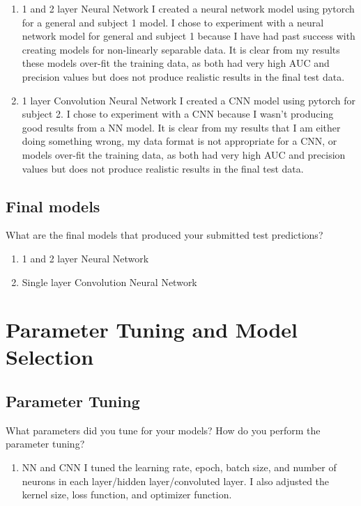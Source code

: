 \documentclass[11pt,a4paper]{article}
\begin{document}
\begin{enumerate}
	\item 1 and 2 layer Neural Network
		\subitem
		I created a neural network model using pytorch for a general and subject 1 model.
		I chose to experiment with a neural network model for general and subject 1 because I have had past success with creating models for non-linearly separable data.
		It is clear from my results these models over-fit the training data, as both had very high AUC and precision values but does not produce realistic results in the final test data.

	\item 1 layer Convolution Neural Network
		\subitem
		I created a CNN model using pytorch for subject 2.
		I chose to experiment with a CNN because I wasn't producing good results from a NN model.
		It is clear from my results that I am either doing something wrong, my data format is not appropriate for a CNN, or models over-fit the training data, as both had very high AUC and precision values but does not produce realistic results in the final test data.
\end{enumerate}


\subsection{Final models}
What are the final models that produced your submitted test predictions?
\begin{enumerate}
	\item 1 and 2 layer Neural Network
	\item Single layer Convolution Neural Network
\end{enumerate}

\section{Parameter Tuning and Model Selection }
\subsection{Parameter Tuning}
What parameters did you tune for your models? How do you perform the parameter tuning?
\begin{enumerate}
	\item NN and CNN
		\subitem
		I tuned the learning rate, epoch, batch size, and number of neurons in each layer/hidden layer/convoluted layer.
		I also adjusted the kernel size, loss function, and optimizer function.
\end{enumerate}
\end{document}
